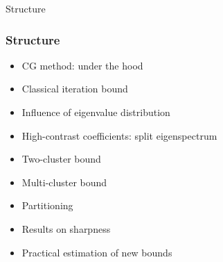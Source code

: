 \begin{frame}[label=toc]{Structure}
    \frametitle{Structure}
    \begin{itemize}
        \item CG method: under the hood
        \item Classical iteration bound
        \item Influence of eigenvalue distribution
        \item High-contrast coefficients: split eigenspectrum
        \item Two-cluster bound
        \item Multi-cluster bound
        \item Partitioning
        \item Results on sharpness
        \item Practical estimation of new bounds
    \end{itemize}
\end{frame}

